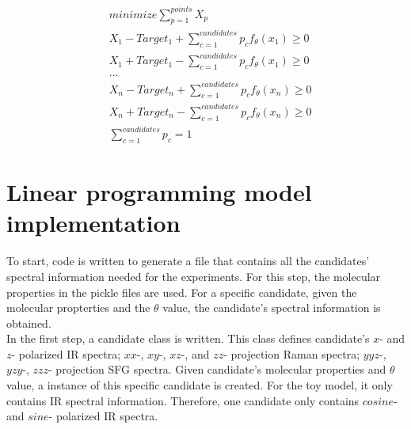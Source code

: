 \begin{eqnarray} \label{eq:3.4}
& minimize \displaystyle\sum^{points}_{p=1} X_p \nonumber \\
& X_1 - Target_1 + \displaystyle\sum^{candidates}_{c=1}p_{c}f_{\theta}(x_1) \geq 0 \nonumber \\
& X_1 + Target_1 - \displaystyle\sum^{candidates}_{c=1}p_{c}f_{\theta}(x_1) \geq 0 \nonumber \\
& ... \nonumber \\
& X_n - Target_n + \displaystyle\sum^{candidates}_{c=1}p_{c}f_{\theta}(x_n) \geq 0 \nonumber \\
& X_n + Target_n - \displaystyle\sum^{candidates}_{c=1}p_{c}f_{\theta}(x_n) \geq 0 \nonumber \\
& \displaystyle\sum^{candidates}_{c=1}p_{c} = 1 
\end{eqnarray} 

\section{Linear programming model implementation}

To start, code is written to generate a file that contains all the candidates' spectral information needed for the experiments. For this step, the molecular properties in the pickle files are used. For a specific candidate, given the molecular propterties and the $\theta$ value, the candidate's spectral information is obtained. \\

In the first step, a candidate class is written. This class defines candidate's $x$- and $z$- polarized IR spectra; $xx$-, $xy$-, $xz$-, and $zz$- projection Raman spectra; $yyz$-, $yzy$-, $zzz$- projection SFG spectra. Given candidate's molecular properties and $\theta$ value, a instance of this specific candidate is created. For the toy model, it only contains IR spectral information. Therefore, one candidate only contains $cosine$- and $sine$- polarized IR spectra. \\



